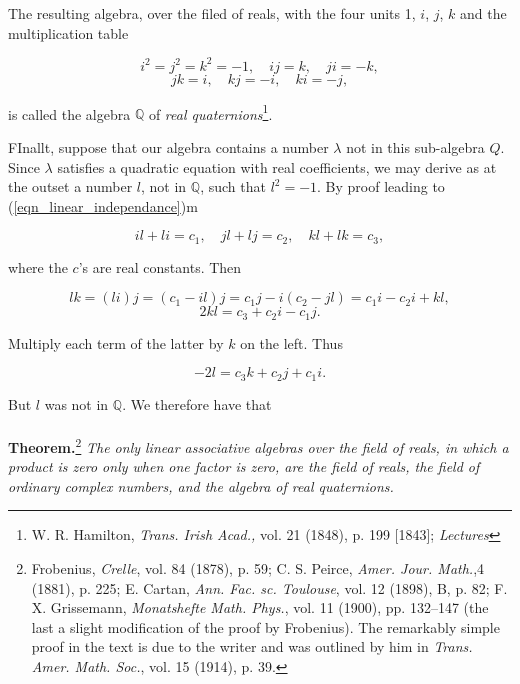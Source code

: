 \documentclass{article}
\begin{document}
The resulting algebra, over the filed of reals, with the four units 1, $i$, $j$, $k$ and the multiplication table

$$
i^{2}=j^{2}=k^{2}=-1,\quad ij=k,\quad ji=-k,
$$
$$
jk=i,\quad kj=-i,\quad ki=-j,
$$

is called the algebra $\mathbb{Q}$ of \textit{real quaternions}\footnote{W. R. Hamilton, \textit{Trans. Irish Acad.,} vol. 21 (1848), p. 199 [1843]; \textit{Lectures}}.

FInallt, suppose that our algebra contains a number $\lambda$ not in this sub-algebra $Q$. Since $\lambda$ satisfies a quadratic equation with real coefficients, we may derive as at the outset a number $l$, not in $\mathbb{Q}$, such that $l^{2}=-1$. By proof leading to (\ref{eqn_linear_independance})m

$$
il+li=c_{1},\quad jl+lj=c_{2},\quad kl+lk=c_{3},
$$

where the $c$'s are real constants. Then

$$
lk = (li)j=(c_{1}-il)j=c_{1}j-i(c_{2}-jl)=c_{1}i-c_{2}i+kl,
$$
$$
2kl=c_{3}+c_{2}i-c_{1}j.
$$

Multiply each term of the latter by $k$ on the left. Thus

$$
-2l=c_{3}k+c_{2}j+c_{1}i.
$$

But $l$ was not in $\mathbb{Q}$. We therefore have that
\\
\\
\textbf{Theorem.}\footnote
{
 Frobenius, \textit{Crelle}, vol. 84 (1878), p. 59; C. S. Peirce, \textit{Amer. Jour. Math.},4 (1881), p. 225;
 E. Cartan, \textit{Ann. Fac. sc. Toulouse}, vol. 12 (1898), B, p. 82;
 F. X. Grissemann, \textit{Monatshefte Math. Phys.}, vol. 11 (1900), pp. 132--147 (the last a slight modification of the proof by Frobenius).
 The remarkably simple proof in the text is due to the writer and was outlined by him in \textit{Trans. Amer. Math. Soc.}, vol. 15 (1914), p. 39.
 }\textit
{
  The only linear associative algebras over the field of reals, in which a product is zero only when one factor is zero, are the field of reals, the field of ordinary complex numbers, and the algebra of real quaternions.
}
\end{document}
